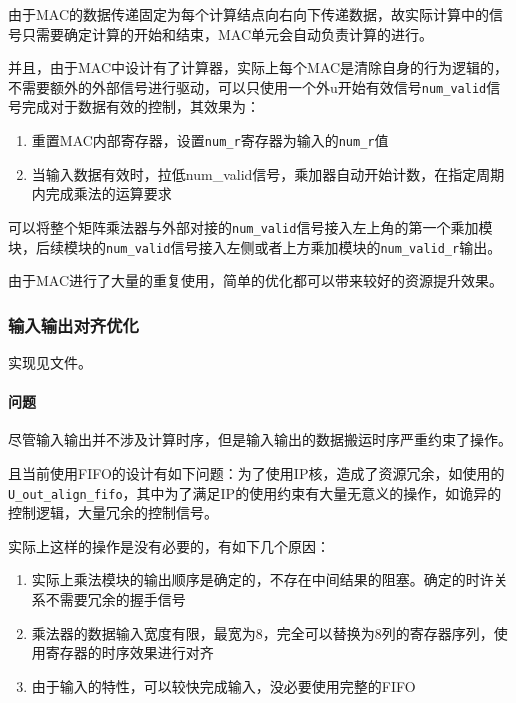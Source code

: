 \documentclass[12pt,a4paper]{article}
\begin{document}
由于MAC的数据传递固定为每个计算结点向右向下传递数据，故实际计算中的信号只需要确定计算的开始和结束，MAC单元会自动负责计算的进行。

并且，由于MAC中设计有了计算器，实际上每个MAC是清除自身的行为逻辑的，不需要额外的外部信号进行驱动，可以只使用一个外u开始有效信号\texttt{num\_valid}信号完成对于数据有效的控制，其效果为：

\begin{enumerate}
\item
  重置MAC内部寄存器，设置\texttt{num\_r}寄存器为输入的\texttt{num\_r}值
\item
  当输入数据有效时，拉低num\_valid信号，乘加器自动开始计数，在指定周期内完成乘法的运算要求
\end{enumerate}

可以将整个矩阵乘法器与外部对接的\texttt{num\_valid}信号接入左上角的第一个乘加模块，后续模块的\texttt{num\_valid}信号接入左侧或者上方乘加模块的\texttt{num\_valid\_r}输出。

由于MAC进行了大量的重复使用，简单的优化都可以带来较好的资源提升效果。

\subsubsection{输入输出对齐优化}

实现见文件。

\paragraph{问题}

尽管输入输出并不涉及计算时序，但是输入输出的数据搬运时序严重约束了操作。

且当前使用FIFO的设计有如下问题：为了使用IP核，造成了资源冗余，如使用的\texttt{U\_out\_align\_fifo}，其中为了满足IP的使用约束有大量无意义的操作，如诡异的控制逻辑，大量冗余的控制信号。

实际上这样的操作是没有必要的，有如下几个原因：

\begin{enumerate}
\item
  实际上乘法模块的输出顺序是确定的，不存在中间结果的阻塞。确定的时许关系不需要冗余的握手信号
\item
  乘法器的数据输入宽度有限，最宽为8，完全可以替换为8列的寄存器序列，使用寄存器的时序效果进行对齐
\item
  由于输入的特性，可以较快完成输入，没必要使用完整的FIFO
\end{enumerate}
\end{document}
